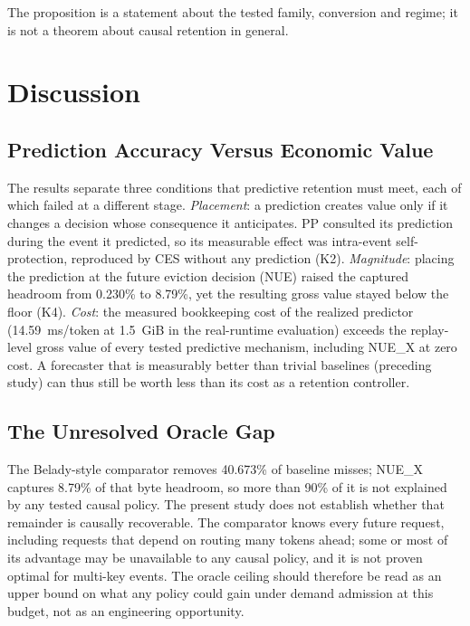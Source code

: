 \documentclass[11pt]{article}
\theoremstyle{plain}
\theoremstyle{definition}
\begin{document}
The proposition is a statement about the tested family, conversion and regime; it is not a theorem about causal retention in general.

\section{Discussion}
\label{sec:discussion}

\subsection{Prediction Accuracy Versus Economic Value}
The results separate three conditions that predictive retention must meet, each of which failed at a different stage. \emph{Placement}: a prediction creates value only if it changes a decision whose consequence it anticipates. PP consulted its prediction during the event it predicted, so its measurable effect was intra-event self-protection, reproduced by CES without any prediction (K2). \emph{Magnitude}: placing the prediction at the future eviction decision (NUE) raised the captured headroom from 0.230\% to 8.79\%, yet the resulting gross value stayed below the floor (K4). \emph{Cost}: the measured bookkeeping cost of the realized predictor (14.59~ms/token at 1.5~GiB in the real-runtime evaluation) exceeds the replay-level gross value of every tested predictive mechanism, including NUE\_X at zero cost. A forecaster that is measurably better than trivial baselines (preceding study) can thus still be worth less than its cost as a retention controller.

\subsection{The Unresolved Oracle Gap}
The Belady-style comparator removes 40.673\% of baseline misses; NUE\_X captures 8.79\% of that byte headroom, so more than 90\% of it is not explained by any tested causal policy. The present study does not establish whether that remainder is causally recoverable. The comparator knows every future request, including requests that depend on routing many tokens ahead; some or most of its advantage may be unavailable to any causal policy, and it is not proven optimal for multi-key events. The oracle ceiling should therefore be read as an upper bound on what any policy could gain under demand admission at this budget, not as an engineering opportunity.
\end{document}
